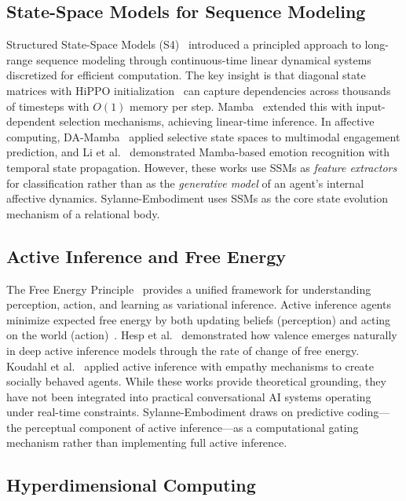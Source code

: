 \documentclass[10pt,twocolumn]{article}
\begin{document}
\subsection{State-Space Models for Sequence Modeling}

Structured State-Space Models (S4)~\cite{gu2022s4} introduced a principled approach to long-range sequence modeling through continuous-time linear dynamical systems discretized for efficient computation. The key insight is that diagonal state matrices with HiPPO initialization~\cite{hippo2020} can capture dependencies across thousands of timesteps with $O(1)$ memory per step. Mamba~\cite{gu2023mamba} extended this with input-dependent selection mechanisms, achieving linear-time inference. In affective computing, DA-Mamba~\cite{damamba2025} applied selective state spaces to multimodal engagement prediction, and Li et al.~\cite{li2025mamba_emotion} demonstrated Mamba-based emotion recognition with temporal state propagation. However, these works use SSMs as \emph{feature extractors} for classification rather than as the \emph{generative model} of an agent's internal affective dynamics. Sylanne-Embodiment uses SSMs as the core state evolution mechanism of a relational body.

\subsection{Active Inference and Free Energy}

The Free Energy Principle~\cite{friston2010freeenergy} provides a unified framework for understanding perception, action, and learning as variational inference. Active inference agents minimize expected free energy by both updating beliefs (perception) and acting on the world (action)~\cite{parr2022active,smith2022step}. Hesp et al.~\cite{hesp2021freeenergy} demonstrated how valence emerges naturally in deep active inference models through the rate of change of free energy. Koudahl et al.~\cite{koudahl2024empathy} applied active inference with empathy mechanisms to create socially behaved agents. While these works provide theoretical grounding, they have not been integrated into practical conversational AI systems operating under real-time constraints. Sylanne-Embodiment draws on predictive coding---the perceptual component of active inference---as a computational gating mechanism rather than implementing full active inference.

\subsection{Hyperdimensional Computing}
\end{document}
